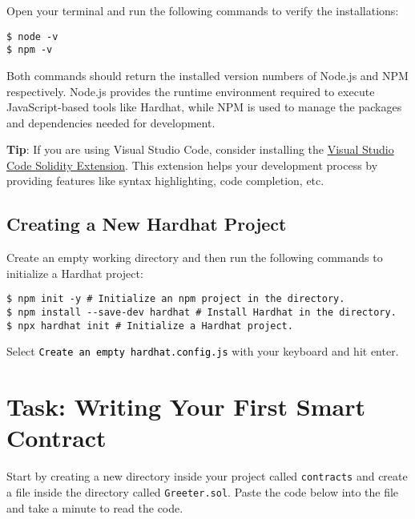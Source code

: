 \documentclass[12pt]{article}
\newcommand{\codegrey}[1]{%
  \texttt{\colorbox{black!4}{\textcolor{black}{#1}}}%
}
\begin{document}
\noindent
Open your terminal and run the following commands to verify the installations:

\begin{verbatim}
$ node -v
$ npm -v
\end{verbatim}

\noindent
Both commands should return the installed version numbers of Node.js and NPM respectively. Node.js provides the runtime environment required to execute JavaScript-based tools like Hardhat, while NPM is used to manage the packages and dependencies needed for development.

\medskip
\noindent
\textbf{Tip}: If you are using Visual Studio Code, consider installing the \href{https://marketplace.visualstudio.com/items?itemName=JuanBlanco.solidity}{Visual Studio Code Solidity Extension}. This extension helps your development process by providing features like syntax highlighting, code completion, etc.

\subsection{Creating a New Hardhat Project}

Create an empty working directory and then run the following commands to
initialize a Hardhat project:

\begin{verbatim}
$ npm init -y # Initialize an npm project in the directory.
$ npm install --save-dev hardhat # Install Hardhat in the directory.
$ npx hardhat init # Initialize a Hardhat project.
\end{verbatim}
Select \codegrey{Create an empty \texttt{hardhat.config.js}} with your keyboard
and hit enter.

\section{Task: Writing Your First Smart Contract}

Start by creating a new directory inside your project called \texttt{contracts}
and create a file inside the directory called \texttt{Greeter.sol}. Paste the
code below into the file and take a minute to read the code.
\end{document}
